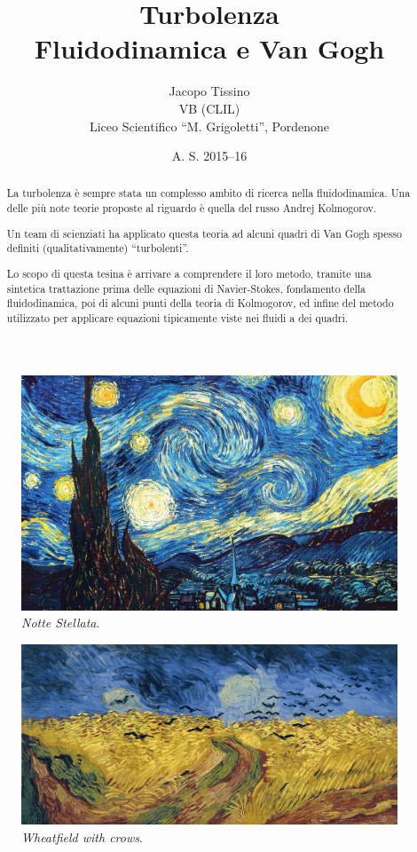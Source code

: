 \documentclass[12pt,a4paper]{article}
\author{Jacopo Tissino \\
VB
(CLIL)\\
Liceo Scientifico ``M. Grigoletti'', Pordenone}
\date{A. S. 2015--16}
\title{\huge{\textbf{Turbolenza}}\\
\Large{Fluidodinamica e Van Gogh}}
\numberwithin{equation}{section}
\begin{document}
\maketitle

\begin{abstract}
La turbolenza è sempre stata un complesso ambito di ricerca nella fluidodinamica. Una delle più note teorie proposte al riguardo è quella del russo Andrej Kolmogorov.

Un team di scienziati \cite{study2006} ha applicato questa teoria ad alcuni quadri di Van Gogh spesso definiti (qualitativamente) ``turbolenti''.

Lo scopo di questa tesina è arrivare a comprendere il loro metodo, tramite una sintetica trattazione prima delle equazioni di Navier-Stokes, fondamento della fluidodinamica, poi di alcuni punti della teoria di Kolmogorov, ed infine del metodo utilizzato per applicare equazioni tipicamente viste nei fluidi a dei quadri.
\end{abstract}

\begin{figure}[h]
    \centering
    \includegraphics[scale=0.15]{the-starry-night-1889.jpg}
    \caption{\emph{Notte Stellata}.}
    \label{starrynight}
\end{figure}

\begin{figure}
    \centering
    \includegraphics[scale=0.12]{wheatfield.jpg}
    \caption{\emph{Wheatfield with crows}.}
    \label{wheatfield}
\end{figure}
\end{document}
